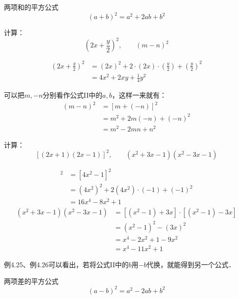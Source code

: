 \begin{blk}{两项和的平方公式}
    \begin{equation*}
        (a+b)^2=a^2+2ab+b^2\tag{II}
    \end{equation*}
\end{blk}

\begin{example}
    计算：
    \[\left(2x+\frac{y}{2}\right)^2,\qquad (m-n)^2  \]
\end{example}

\begin{solution}
\[\begin{split}
    \left(2x+\frac{y}{2}\right)^2&=(2x)^2+2\cdot (2x)\cdot \left(\frac{y}{2}\right)+\left(\frac{y}{2}\right)^2\\
    &=4x^2+2xy+\frac{1}{4}y^2
\end{split}\]

可以把$m,-n$分别看作公式II中的$a,b$，这样一来就有：
\[\begin{split}
    (m-n)^2&=[m+(-n)]^2\\
    &=m^2+2m(-n)+(-n)^2\\
    &=m^2-2mn+n^2
\end{split}\]

\end{solution}

\begin{example}
计算：
\[[(2x+1)(2x-1)]^2,\qquad (x^2+3x-1)(x^2-3x-1) \]
\end{example}

\begin{solution}
\begin{align*}
    [(2x+1)(2x-1)]^2&=[4x^2-1]^2 \tag{公式I}\\
    &=(4x^2)^2+2(4x^2)\cdot (-1)+(-1)^2 \tag{公式II}\\
    &=16x^4-8x^2+1
\end{align*}    
\begin{align*}
    (x^2+3x-1)(x^2-3x-1) &= [(x^2-1)+3x]\cdot [(x^2-1)-3x] \\
    &=(x^2-1)^2-(3x)^2\\
    &=x^4-2x^2+1-9x^2\\
    &=x^4-11x^2+1
\end{align*}  
\end{solution}

例4.25、例4.26可以看出，若将公式II中的$b$用$-b$代换，就能得到另一个公式．

\begin{blk}{两项差的平方公式}
\begin{equation*}
    (a-b)^2=a^2-2ab+b^2 \tag{III}
\end{equation*}    
\end{blk}

